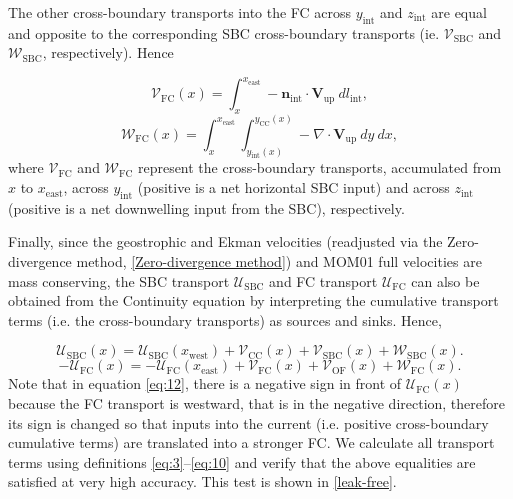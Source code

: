 \documentclass[preprint,3p,review,12pt]{elsarticle}
\renewcommand{\Vec}[1]{\mathbf{#1}}
\newcommand{\sub}[1]{_{\text{#1}}}
\begin{document}
The other cross-boundary transports into the FC across $y\sub{int}$ and $z\sub{int}$ are equal and opposite to the corresponding SBC cross-boundary transports (ie. $\mathcal{V}\sub{SBC}$ and $\mathcal{W}\sub{SBC}$, respectively). Hence

\begin{equation} \label{eq:9}
\mathcal{V}\sub{FC}(x) = \int_{x}^{x\sub{east}}-\Vec{n}\sub{int}\cdot\Vec{V}\sub{up}\ dl\sub{int},
\end{equation}
%
\begin{equation} \label{eq:10}
\mathcal{W}\sub{FC}(x) = \int_{x}^{x\sub{east}} \int_{y\sub{int}(x)}^{y\sub{CC}(x)} -\nabla\cdot\Vec{V}\sub{up}\ dy\ dx,
\end{equation}
%
where $\mathcal{V}\sub{FC}$ and $\mathcal{W}\sub{FC}$ represent the cross-boundary transports, accumulated from $x$ to $x\sub{east}$, across $y\sub{int}$ (positive is a net horizontal SBC input) and across $z\sub{int}$ (positive is a net downwelling input from the SBC), respectively.

Finally, since the geostrophic and Ekman velocities (readjusted via the Zero-divergence method, \ref{Zero-divergence method}) and MOM01 full velocities are mass conserving, the SBC transport $\mathcal{U}\sub{SBC}$ and FC transport $\mathcal{U}\sub{FC}$ can also be obtained from the Continuity equation by interpreting the cumulative transport terms (i.e. the cross-boundary transports) as sources and sinks. Hence,

\begin{equation} \label{eq:11}
\mathcal{U}\sub{SBC}(x) = \mathcal{U}\sub{SBC}(x\sub{west}) + \mathcal{V}\sub{CC}(x) + \mathcal{V}\sub{SBC}(x) + \mathcal{W}\sub{SBC}(x).
\end{equation}
%
\begin{equation} \label{eq:12}
-\mathcal{U}\sub{FC}(x) = -\mathcal{U}\sub{FC}(x\sub{east}) + \mathcal{V}\sub{FC}(x) + \mathcal{V}\sub{OF}(x) + \mathcal{W}\sub{FC}(x).
\end{equation}
%
Note that in equation \ref{eq:12}, there is a negative sign in front of $\mathcal{U}\sub{FC}(x)$ because the FC transport is westward, that is in the negative direction, therefore its sign is changed so that inputs into the current (i.e. positive cross-boundary cumulative terms) are translated into a stronger FC. We calculate all transport terms using definitions \ref{eq:3}--\ref{eq:10} and verify that the above equalities are satisfied at very high accuracy. This test is shown in \ref{leak-free}.
\end{document}
